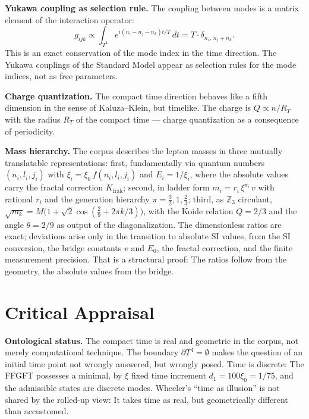 \textbf{Yukawa coupling as selection rule.} The coupling between modes
is a matrix element of the interaction operator:
\begin{equation}
  g_{ijk}\propto\int_{T^1}e^{i(n_i-n_j-n_k)t/T}\,dt
  = T\cdot\delta_{n_i,\,n_j+n_k}.
\end{equation}
This is an exact conservation of the mode index in the time direction. The
Yukawa couplings of the Standard Model appear as selection rules for
the mode indices, not as free parameters.

\textbf{Charge quantization.} The compact time direction behaves
like a fifth dimension in the sense of Kaluza--Klein, but timelike.
The charge is $Q\propto n/R_T$ with the radius $R_T$ of the compact time
--- charge quantization as a consequence of periodicity.

\textbf{Mass hierarchy.} The corpus describes the lepton masses in
three mutually translatable representations: first, fundamentally via
quantum numbers $(n_i,l_i,j_i)$ with $\xi_i = \xi_0\,f(n_i,l_i,j_i)$ and
$E_i = 1/\xi_i$, where the absolute values carry the fractal correction
$K_{\mathrm{frak}}$; second, in ladder form
$m_i = r_i\,\xi^{\pi_i}\,v$ with rational $r_i$ and the
generation hierarchy $\pi = \frac32, 1, \frac23$; third, as
$\mathbb{Z}_3$ circulant, $\sqrt{m_k} = M\bigl(1+\sqrt2\cos(\frac29+2\pi k/3)\bigr)$,
with the Koide relation $Q = 2/3$ and the angle $\theta = 2/9$ as
output of the diagonalization. The dimensionless ratios are
exact; deviations arise only in the transition to absolute
SI values, from the SI conversion, the bridge constants $v$ and $E_0$,
the fractal correction, and the finite measurement precision. That is a
structural proof: The ratios follow from the geometry, the
absolute values from the bridge.

\section{Critical Appraisal}

\textbf{Ontological status.} The compact time is real and
geometric in the corpus, not merely computational technique. The boundary $\partial T^4 = \emptyset$
makes the question of an initial time point not wrongly answered,
but wrongly posed. Time is discrete: The FFGFT possesses a
minimal, by $\xi$ fixed time increment $d_1 = 100\xi_0 = 1/75$,
and the admissible states are discrete modes. Wheeler's
\enquote{time as illusion} is not shared by the rolled-up view: It
takes time as real, but geometrically different than accustomed.

